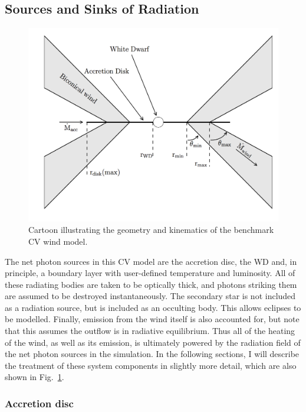 \subsection{Sources and Sinks of Radiation}
\label{radsources}

\begin{figure} 
\centering
\includegraphics[width=1.0\textwidth]{figures/05-cvpaper/fig2_cartoon.png}
\caption{Cartoon illustrating the geometry and kinematics of the benchmark CV wind model.}
\label{cartoon}
\end{figure} 

The net photon sources in this CV model are the accretion disc, the
WD and, in principle, a boundary layer with user-defined temperature
and luminosity. All of these radiating bodies are taken to be
optically thick, and photons striking them are assumed to be destroyed
instantaneously. The secondary star is not included as a radiation
source, but is included as an occulting body. This allows eclipses to be
modelled. Finally, emission from the wind itself is also accounted for, but
note that this assumes the outflow is in radiative equilibrium. Thus all
of the heating of the wind, as well as its emission, is ultimately
powered by the radiation field of the net photon sources in the
simulation. In the following sections, I will describe the treatment
of these system components in slightly more detail, which are also
shown in Fig.~\ref{cartoon}.

\subsubsection{Accretion disc}

